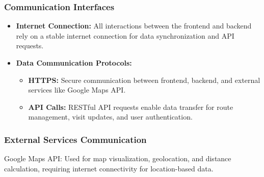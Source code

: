 \subsubsection{Communication Interfaces}
\begin{itemize}
    \item \textbf{Internet Connection:} All interactions between the frontend and backend rely on a stable internet connection for data synchronization and API requests.
\newpage
    \item \textbf{Data Communication Protocols:}
    \begin{itemize}
        \item \textbf{HTTPS:} Secure communication between frontend, backend, and external services like Google Maps API.
        \item \textbf{API Calls:} RESTful API requests enable data transfer for route management, visit updates, and user authentication.
    \end{itemize}
\end{itemize}

\subsubsection{External Services Communication}
Google Maps API: Used for map visualization, geolocation, and distance calculation, requiring internet connectivity for location-based data.


